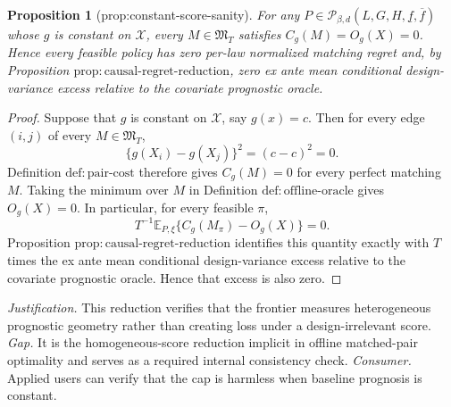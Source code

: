 \documentclass{article}
\newtheorem{proposition}{Proposition}
\begin{document}
\begin{proposition}[prop:constant-score-sanity]\label{prop:constant-score-sanity}
For any \(P\in\mathcal P_{\beta,d}(L,G,H,\underline f,\overline f)\) whose \(g\) is constant on \(\mathcal X\), every \(M\in\mathfrak M_T\) satisfies \(C_g(M)=O_g(X)=0\).  Hence every feasible policy has zero per-law normalized matching regret and, by Proposition \(\mathrm{prop:causal\text{-}regret\text{-}reduction}\), zero ex ante mean conditional design-variance excess relative to the covariate prognostic oracle.
\end{proposition}
\begin{proof}
Suppose that \(g\) is constant on \(\mathcal X\), say \(g(x)=c\).  Then for every edge \((i,j)\) of every \(M\in\mathfrak M_T\),
\[
\{g(X_i)-g(X_j)\}^2=(c-c)^2=0.
\]
Definition \(\mathrm{def:pair\text{-}cost}\) therefore gives \(C_g(M)=0\) for every perfect matching \(M\).  Taking the minimum over \(M\) in Definition \(\mathrm{def:offline\text{-}oracle}\) gives \(O_g(X)=0\).  In particular, for every feasible \(\pi\),
\[
T^{-1}\mathbb E_{P,\xi}\{C_g(M_\pi)-O_g(X)\}=0.
\]
Proposition \(\mathrm{prop:causal\text{-}regret\text{-}reduction}\) identifies this quantity exactly with \(T\) times the ex ante mean conditional design-variance excess relative to the covariate prognostic oracle.  Hence that excess is also zero.
\end{proof}
\par\smallskip\noindent \textit{Justification.} This reduction verifies that the frontier measures heterogeneous prognostic geometry rather than creating loss under a design-irrelevant score. \textit{Gap.} It is the homogeneous-score reduction implicit in offline matched-pair optimality and serves as a required internal consistency check. \textit{Consumer.} Applied users can verify that the cap is harmless when baseline prognosis is constant.
\end{document}
